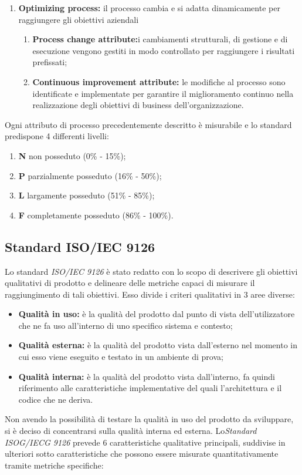 \documentclass[12pt,a4paper]{article}
\begin{document}
\begin{enumerate}
	\item\textbf{Optimizing process:} il processo cambia e si adatta dinamicamente per raggiungere gli obiettivi aziendali
	\begin{enumerate}
		\item \textbf{Process change attribute:}i cambiamenti strutturali, di gestione e di esecuzione vengono gestiti in modo controllato per raggiungere i risultati prefissati;
		\item \textbf{Continuous improvement attribute:} le modifiche al processo sono identificate e implementate per garantire il miglioramento continuo nella realizzazione degli obiettivi di business dell'organizzazione.
	\end{enumerate}
\end{enumerate}

Ogni attributo di processo precedentemente descritto è misurabile e lo standard predispone
4 differenti livelli:
\begin{enumerate}
	\item \textbf{N} non posseduto (0\% - 15\%);
	\item \textbf{P} parzialmente posseduto (16\% - 50\%);
	\item \textbf{L} largamente posseduto (51\% - 85\%);
	\item \textbf{F} completamente posseduto (86\% - 100\%).
\end{enumerate}

\subsection{Standard ISO/IEC 9126}
Lo standard \textit{ISO/IEC 9126} è stato redatto con lo scopo di descrivere gli obiettivi
qualitativi di prodotto e delineare delle metriche capaci di misurare il raggiungimento
di tali obiettivi. Esso divide i criteri qualitativi in 3 aree diverse:
\begin{itemize}
	\item \textbf{Qualità in uso:} è la qualità del prodotto   dal punto di vista dell'utilizzatore che ne fa uso all'interno di uno specifico sistema e contesto;
	\item \textbf{Qualità esterna:} è la qualità del prodotto   vista dall'esterno nel momento in cui esso viene eseguito e testato in un ambiente di prova;
	\item \textbf{Qualità interna:} è la qualità del prodotto   vista dall'interno, fa quindi riferimento alle caratteristiche implementative del   quali l'architettura e il codice che ne deriva.
\end{itemize}
Non avendo la possibilità di testare la qualità in uso del prodotto   da sviluppare, si è deciso di concentrarsi sulla qualità interna ed esterna. Lo\textit{Standard ISOG/IECG 9126}
prevede 6 caratteristiche qualitative principali, suddivise in ulteriori sotto caratteristiche
che possono essere misurate quantitativamente tramite metriche specifiche:
\end{document}
